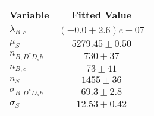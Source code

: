 \begin{tabular}[t]{lc}
\hline
Variable &Fitted Value\\
\hline\hline
$\lambda_{B,c}$&$(-0.0\pm2.6)e-07$\\
\hline
$\mu_S$&$5279.45\pm0.50$\\
\hline
$n_{B, D^* D_s h}$&$730\pm37$\\
\hline
$n_{B,c}$&$73\pm41$\\
\hline
$n_S$&$1455\pm36$\\
\hline
$\sigma_{B, D^* D_s h}$&$69.3\pm2.8$\\
\hline
$\sigma_S$&$12.53\pm0.42$\\
\hline
\end{tabular}